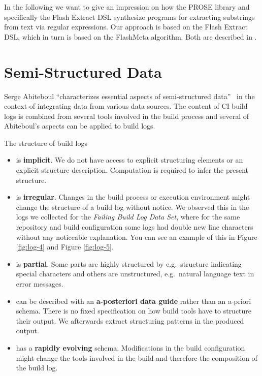 \documentclass[\myrootdir/main.tex]{subfiles}
\begin{document}
In the following we want to give an impression on how the PROSE library and specifically the Flash Extract DSL synthesize programs for extracting substrings from text via regular expressions.
Our approach is based on the Flash Extract DSL, which in turn is based on the FlashMeta algorithm. Both are described in .

\section{Semi-Structured Data}
\label{sec:rw-semi-structured-data}
Serge Abiteboul ``characterizes essential aspects of semi-structured data''~\cite{abiteboul1997querying} in the context of integrating data from various data sources.
The content of CI build logs is combined from several tools involved in the build process and several of Abiteboul's aspects can be applied to build logs.

The structure of build logs
\begin{itemize}
  \item is \textbf{implicit}.
  We do not have access to explicit structuring elements or an explicit structure description.
  Computation is required to infer the present structure.
  \item is \textbf{irregular}.
  Changes in the build process or execution environment might change the structure of a build log without notice.
  We observed this in the logs we collected for the \emph{Failing Build Log Data Set}, where for the same repository and build configuration some logs had double new line characters without any noticeable explanation.
  You can see an example of this in Figure \ref{fig:log-4} and Figure \ref{fig:log-5}.
  \item is \textbf{partial}. Some parts are highly structured by e.g.\ structure indicating special characters and others are unstructured, e.g.\ natural language text in error messages.
  \item can be described with an \textbf{a-posteriori data guide} rather than an a-priori schema.
  There is no fixed specification on how build tools have to structure their output.
  We afterwards extract structuring patterns in the produced output.
  \item has a \textbf{rapidly evolving} schema.
  Modifications in the build configuration might change the tools involved in the build and therefore the composition of the build log.
\end{itemize}
\end{document}
